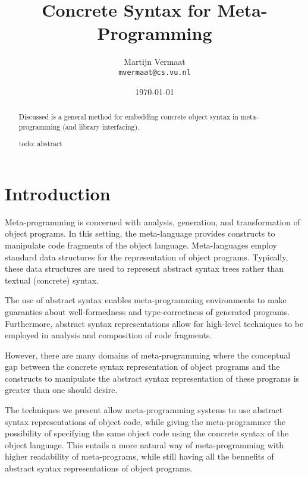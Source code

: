 \documentclass[a4paper,11pt]{article}
\title{Concrete Syntax for Meta-Programming}
\author{Martijn Vermaat\\
\texttt{mvermaat@cs.vu.nl}}
\date{\today}
\begin{document}
\maketitle


\lstset{
  numbers=none,
  basicstyle=\footnotesize\ttfamily,
  frame=tb,
  language=Pascal,
  captionpos=b,
  xleftmargin=1em,
  xrightmargin=1em,
  aboveskip=1em,
  belowskip=1em
}


\begin{abstract}
Discussed is a general method for embedding concrete object syntax in
meta-programming (and library interfacing).

todo: abstract
\end{abstract}


\section{Introduction}\label{sec:introduction}

Meta-programming is concerned with analysis, generation, and transformation
of object programs. In this setting, the meta-language provides constructs
to manipulate code fragments of the object language. Meta-languages employ
standard data structures for the representation of object programs. Typically,
these data structures are used to represent abstract syntax trees rather
than textual (concrete) syntax.

The use of abstract syntax enables meta-programming environments to make
guaranties about well-formedness and type-correctness of generated programs.
Furthermore, abstract syntax representations allow for high-level techniques
to be employed in analysis and composition of code fragments.

However, there are many domains of meta-programming where the conceptual gap
between the concrete syntax representation of object programs and the constructs
to manipulate the abstract syntax representation of these programs is greater
than one should desire.

The techniques we present allow meta-programming systems to use abstract
syntax representations of object code, while giving the meta-programmer the
possibility of specifying the same object code using the concrete syntax of
the object language. This entails a more natural way of meta-programming with
higher readability of meta-programs, while still having all the bennefits of
abstract syntax representations of object programs.

\paragraph{}
\end{document}

